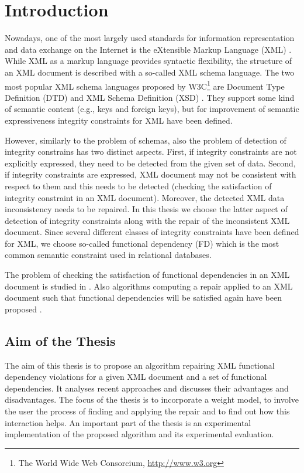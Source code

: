 \chapter{Introduction}

Nowadays, one of the most largely used standards for information representation and data exchange on the Internet is the eXtensible Markup Language (XML) \cite{xml}. While XML as a markup language provides syntactic flexibility, the structure of an XML document is described with a so-called XML schema language. The two most popular XML schema languages proposed by W3C\footnote{The World Wide Web Consorcium, \url{http://www.w3.org}} are Document Type Definition (DTD) \cite{xml} and XML Schema Definition (XSD) \cite{xsd1,xsd2,xsd3}. They support some kind of semantic content (e.g., keys and foreign keys), but for improvement of semantic expressiveness integrity constraints for XML \cite{ic} have been defined.

However, similarly to the problem of schemas, also the problem of detection of integrity constrains has two distinct aspects. First, if integrity constraints are not explicitly expressed, they need to be detected from the given set of data. Second, if integrity constraints are expressed, XML document may not be consistent with respect to them and this needs to be detected (checking the satisfaction of integrity constraint in an XML document). Moreover, the detected XML data inconsistency needs to be repaired. In this thesis we choose the latter aspect of detection of integrity constraints along with the repair of the inconsistent XML document. Since several different classes of integrity constraints have been defined for XML, we choose so-called functional dependency (FD) \cite{fd} which is the most common semantic constraint used in relational databases.

The problem of checking the satisfaction of functional dependencies in an XML document is studied in \cite{satifFD}. Also algorithms computing a repair applied to an XML document such that functional dependencies will be satisfied again have been proposed \cite{RepAndConsistentAnswer, QueryXML, ImprovingXML}.

\section{Aim of the Thesis}

The aim of this thesis is to propose an algorithm repairing XML functional dependency violations for a given XML document and a set of functional dependencies. It analyses recent approaches and discusses their advantages and disadvantages. The focus of the thesis is to incorporate a weight model, to involve the user the process of finding and applying the repair and to find out how this interaction helps. An important part of the thesis is an experimental implementation of the proposed algorithm and its experimental evaluation.

